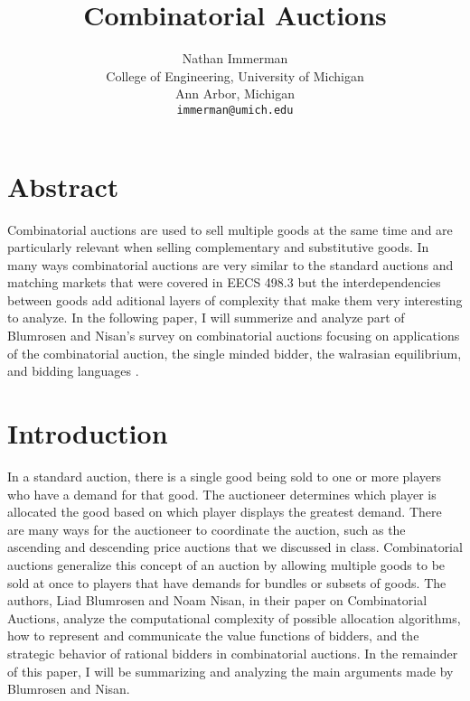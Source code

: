 \documentclass[10pt,onecolumn,letterpaper]{article}
\theoremstyle{definition}
\begin{document}
\title{Combinatorial Auctions}

\author{Nathan Immerman\\
College of Engineering, University of Michigan\\
Ann Arbor, Michigan\\
{\tt\small immerman@umich.edu}
}

\maketitle


\section{Abstract}

Combinatorial auctions are used to sell multiple goods at the same time and are particularly relevant when selling complementary and substitutive goods. In many ways combinatorial auctions are very similar to the standard auctions and matching markets that were covered in EECS 498.3 but the interdependencies between goods add aditional layers of complexity that make them very interesting to analyze. In the following paper, I will summerize and analyze part of Blumrosen and Nisan's survey on combinatorial auctions focusing on applications of the combinatorial auction, the single minded bidder, the walrasian equilibrium, and bidding languages \cite{paper}.

\section{Introduction} %

In a standard auction, there is a single good being sold to one or more players who have a demand for that good. The auctioneer determines which player is allocated the good based on which player displays the greatest demand. There are many ways for the auctioneer to coordinate the auction, such as the ascending and descending price auctions that we discussed in class. Combinatorial auctions generalize this concept of an auction by allowing multiple goods to be sold at once to players that have demands for bundles or subsets of goods. The authors, Liad Blumrosen and Noam Nisan, in their paper on Combinatorial Auctions, analyze the computational complexity of possible allocation algorithms, how to represent and communicate the value functions of bidders, and the strategic behavior of rational bidders in combinatorial auctions. In the remainder of this paper, I will be summarizing and analyzing the main arguments made by Blumrosen and Nisan.
\end{document}
